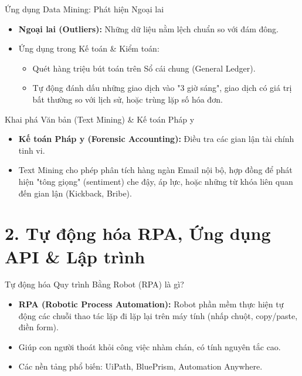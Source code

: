 \documentclass[aspectratio=169,12pt]{beamer}
\begin{document}
\begin{frame}{Ứng dụng Data Mining: Phát hiện Ngoại lai}
    \begin{itemize}
        \item \textbf{Ngoại lai (Outliers):} Những dữ liệu nằm lệch chuẩn so với đám đông.
        \item Ứng dụng trong Kế toán \& Kiểm toán:
        \begin{itemize}
            \item Quét hàng triệu bút toán trên Sổ cái chung (General Ledger).
            \item Tự động đánh dấu những giao dịch vào "3 giờ sáng", giao dịch có giá trị bất thường so với lịch sử, hoặc trùng lặp số hóa đơn.
        \end{itemize}
    \end{itemize}
\end{frame}

\begin{frame}{Khai phá Văn bản (Text Mining) \& Kế toán Pháp y}
    \begin{itemize}
        \item \textbf{Kế toán Pháp y (Forensic Accounting):} Điều tra các gian lận tài chính tinh vi.
        \item Text Mining cho phép phân tích hàng ngàn Email nội bộ, hợp đồng để phát hiện "tông giọng" (sentiment) che đậy, áp lực, hoặc những từ khóa liên quan đến gian lận (Kickback, Bribe).
    \end{itemize}
\end{frame}

\section{2. Tự động hóa RPA, Ứng dụng API \& Lập trình}
\begin{frame}
    \tableofcontents[currentsection]
\end{frame}

\begin{frame}{Tự động hóa Quy trình Bằng Robot (RPA) là gì?}
    \begin{itemize}
        \item \textbf{RPA (Robotic Process Automation):} Robot phần mềm thực hiện tự động các chuỗi thao tác lặp đi lặp lại trên máy tính (nhấp chuột, copy/paste, điền form).
        \item Giúp con người thoát khỏi công việc nhàm chán, có tính nguyên tắc cao.
        \item Các nền tảng phổ biến: UiPath, BluePrism, Automation Anywhere.
    \end{itemize}
\end{frame}
\end{document}
